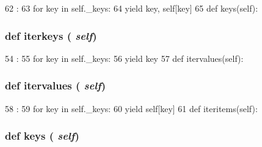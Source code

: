 \begin{DoxyCode}
62                        :
63         for key in self._keys:
64             yield key, self[key]
65 
    def keys(self):
\end{DoxyCode}
\hypertarget{classm5_1_1util_1_1orderdict_1_1orderdict_a44560b0b40dfcd2069b980760783cc7b}{
\subsubsection[{iterkeys}]{\setlength{\rightskip}{0pt plus 5cm}def iterkeys ( {\em self})}}
\label{classm5_1_1util_1_1orderdict_1_1orderdict_a44560b0b40dfcd2069b980760783cc7b}



\begin{DoxyCode}
54                       :
55         for key in self._keys:
56             yield key
57 
    def itervalues(self):
\end{DoxyCode}
\hypertarget{classm5_1_1util_1_1orderdict_1_1orderdict_aeb6e8630a10560ad0d4b34377c790f19}{
\subsubsection[{itervalues}]{\setlength{\rightskip}{0pt plus 5cm}def itervalues ( {\em self})}}
\label{classm5_1_1util_1_1orderdict_1_1orderdict_aeb6e8630a10560ad0d4b34377c790f19}



\begin{DoxyCode}
58                         :
59         for key in self._keys:
60             yield self[key]
61 
    def iteritems(self):
\end{DoxyCode}
\hypertarget{classm5_1_1util_1_1orderdict_1_1orderdict_aeb7ba70a3c91eced4f8d49ac5dc0c398}{
\subsubsection[{keys}]{\setlength{\rightskip}{0pt plus 5cm}def keys ( {\em self})}}
\label{classm5_1_1util_1_1orderdict_1_1orderdict_aeb7ba70a3c91eced4f8d49ac5dc0c398}



